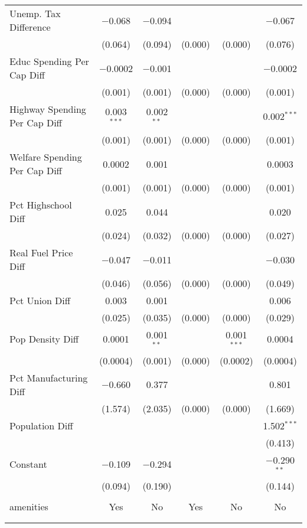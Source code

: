 \begin{table}[!htbp]
\begin{tabular}{@{\extracolsep{5pt}}lccccc}
  Unemp. Tax Difference & $-$0.068 & $-$0.094 &  &  & $-$0.067 \\ 
  & (0.064) & (0.094) & (0.000) & (0.000) & (0.076) \\ 
  Educ Spending Per Cap Diff & $-$0.0002 & $-$0.001 &  &  & $-$0.0002 \\ 
  & (0.001) & (0.001) & (0.000) & (0.000) & (0.001) \\ 
  Highway Spending Per Cap Diff & 0.003$^{***}$ & 0.002$^{**}$ &  &  & 0.002$^{***}$ \\ 
  & (0.001) & (0.001) & (0.000) & (0.000) & (0.001) \\ 
  Welfare Spending Per Cap Diff & 0.0002 & 0.001 &  &  & 0.0003 \\ 
  & (0.001) & (0.001) & (0.000) & (0.000) & (0.001) \\ 
  Pct Highschool Diff & 0.025 & 0.044 &  &  & 0.020 \\ 
  & (0.024) & (0.032) & (0.000) & (0.000) & (0.027) \\ 
  Real Fuel Price Diff & $-$0.047 & $-$0.011 &  &  & $-$0.030 \\ 
  & (0.046) & (0.056) & (0.000) & (0.000) & (0.049) \\ 
  Pct Union Diff & 0.003 & 0.001 &  &  & 0.006 \\ 
  & (0.025) & (0.035) & (0.000) & (0.000) & (0.029) \\ 
  Pop Density Diff & 0.0001 & 0.001$^{**}$ &  & 0.001$^{***}$ & 0.0004 \\ 
  & (0.0004) & (0.001) & (0.000) & (0.0002) & (0.0004) \\ 
  Pct Manufacturing Diff & $-$0.660 & 0.377 &  &  & 0.801 \\ 
  & (1.574) & (2.035) & (0.000) & (0.000) & (1.669) \\ 
  Population Diff &  &  &  &  & 1.502$^{***}$ \\ 
  &  &  &  &  & (0.413) \\ 
  Constant & $-$0.109 & $-$0.294 &  &  & $-$0.290$^{**}$ \\ 
  & (0.094) & (0.190) &  &  & (0.144) \\ 
 \hline \\[-1.8ex] 
amenities & Yes & No & Yes & No & No \\ 
\hline \\[-1.8ex] 
\hline 
\hline \\[-1.8ex] 
\end{tabular} 
\end{table} 
